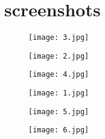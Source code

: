 \section*{screenshots}
\begin{figure}[!h]
\vspace{.5cm}
 \texttt{[image: 3.jpg]} 
  \label{fig:3}
\end{figure}

\begin{figure}[!h]
\vspace{.05cm}
  \texttt{[image: 2.jpg]} 
  \label{fig:2}
\end{figure}

\begin{figure}[!h]
\vspace{.5cm}
  \texttt{[image: 4.jpg]} 
  \label{fig:4}
\end{figure}

\begin{figure}[!h]
\vspace{2cm}
  \texttt{[image: 1.jpg]} 
  \label{fig:1}
\end{figure}

\begin{figure}[!h]
\vspace{.5cm}
  \texttt{[image: 5.jpg]} 
  \label{fig:5}
\end{figure}

\begin{figure}[!h]
\vspace{.5cm}
  \texttt{[image: 6.jpg]} 
  \label{fig:6}
\end{figure}